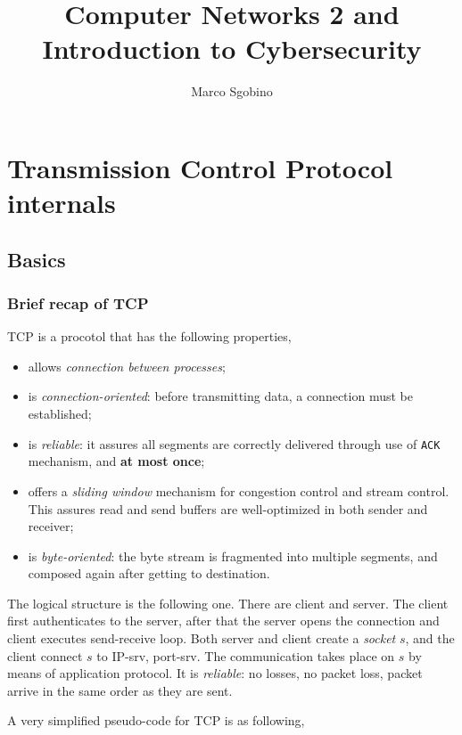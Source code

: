 \documentclass[a4paper, 11pt]{report}
\begin{document}
\title{Computer Networks 2 and Introduction to Cybersecurity}
\author{Marco Sgobino}
\maketitle
\tableofcontents

\part{Transmission Control Protocol internals}

\chapter{Basics}

\section{Brief recap of TCP}
TCP is a procotol that has the following properties,

\begin{itemize}
	\item allows \emph{connection between processes};
	\item is \emph{connection-oriented}: before transmitting data, a
		connection must be established;
	\item is \emph{reliable}: it assures all segments are correctly
		delivered through use of \texttt{ACK} mechanism, and \textbf{at
		most once};
	\item offers a \emph{sliding window} mechanism for congestion control
		and stream control. This assures read and send buffers are
		well-optimized in both sender and receiver;
	\item is \emph{byte-oriented}: the byte stream is fragmented into
		multiple segments, and composed again after getting to
		destination.
\end{itemize}

The logical structure is the following one. There are client and server. The
client first authenticates to the server, after that the server opens the
connection and client executes send-receive loop. Both server and client create
a \emph{socket} $s$, and the client connect $s$ to IP-srv, port-srv. The
communication takes place on $s$ by means of application protocol. It is
\emph{reliable}: no losses, no packet loss, packet arrive in the same order as
they are sent.

A very simplified pseudo-code for TCP is as following,
\end{document}
